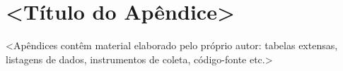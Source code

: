 \chapter{<Título do Apêndice>}
\label{apx:apendice-a}

<Apêndices contêm material elaborado pelo próprio autor: tabelas extensas,
listagens de dados, instrumentos de coleta, código-fonte etc.>

